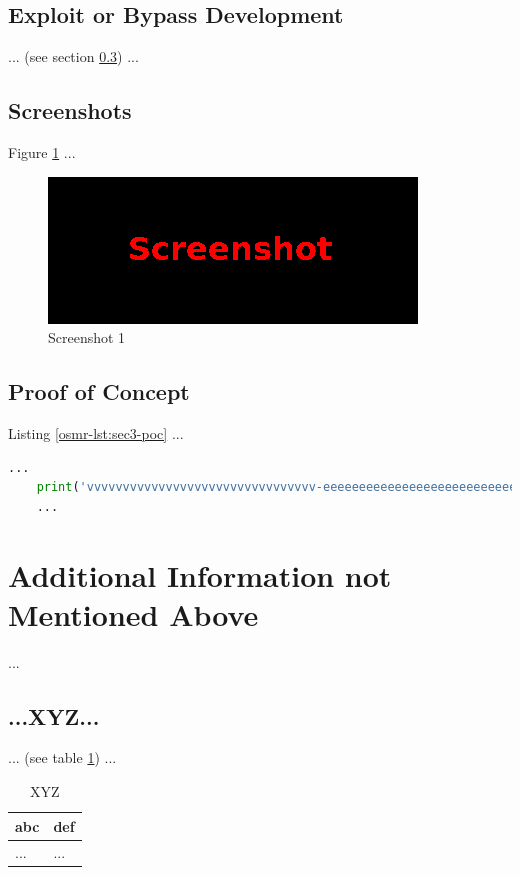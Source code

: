 \subsection{Exploit or Bypass Development}\label{osmr-sec:sec3-expl}
%
... (see section \ref{osmr-sec:sec3-poc}) ...
%
%
%
\subsection{Screenshots}\label{osmr-sec:sec3-screens}
%
Figure \ref{osmr-fig:sec3-screen1} ...

\begin{figure}[H]
    \centering
    \includegraphics[width=\textwidth]{img/assignment1/screen1.png}
    \caption{Screenshot 1}\label{osmr-fig:sec3-screen1}
\end{figure}
%
%
%
\subsection{Proof of Concept}\label{osmr-sec:sec3-poc}
%
Listing \ref{osmr-lst:sec3-poc} ...\\

\begin{lstlisting}[language=Python,caption={Proof of Concept}, label={osmr-lst:sec3-poc}]
    ...
    print('vvvvvvvvvvvvvvvvvvvvvvvvvvvvvvvv-eeeeeeeeeeeeeeeeeeeeeeeeeeeeeeeeeeeeeeeeeee-looooooooooooooooooooooong-striiiiiiiiiiiiiing')
    ...
\end{lstlisting}
%
%
%
\section{Additional Information not Mentioned Above}\label{osmr-sec:last}
%
...
%
%
%
\subsection{...XYZ...}\label{osmr-sec:last-xyz}
%
... (see table \ref{osmr-tbl:last-xyz}) ...

\begin{table}[H]
    \begin{tabularx}{\textwidth}{l|l}
        \textbf{abc} & \textbf{def} \\
        \hline
        ... & ...\\
    \end{tabularx}
    \caption{XYZ\label{osmr-tbl:last-xyz}}
\end{table}
%
%
%